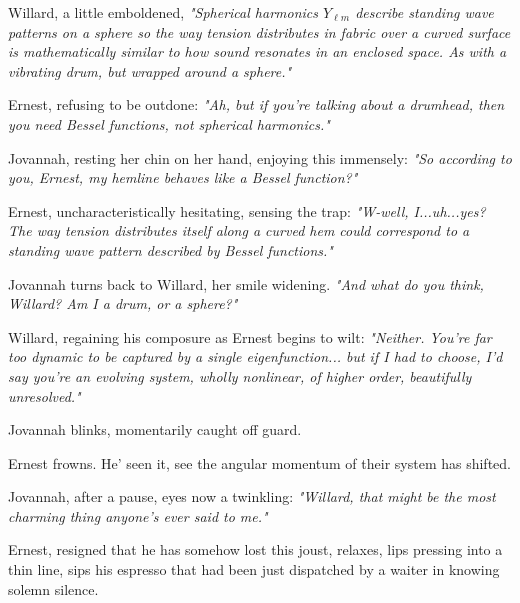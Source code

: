 \bigskip

Willard, a little emboldened,  \textit{"Spherical harmonics $Y_{\ell m}$ describe standing wave patterns on a sphere so the way tension distributes in fabric over a curved surface is mathematically similar to how sound resonates in an enclosed space. As with a vibrating drum, but wrapped around a sphere."}  

\bigskip

Ernest, refusing to be outdone: \textit{"Ah, but if you’re talking about a drumhead, then you need Bessel functions, not spherical harmonics."}  

\bigskip

Jovannah, resting her chin on her hand, enjoying this immensely:  
\textit{"So according to you, Ernest, my hemline behaves like a Bessel function?"}

\bigskip

Ernest, uncharacteristically hesitating, sensing the trap:  \textit{"W-well, I...uh...yes? The way tension distributes itself along a curved hem could correspond to a standing wave pattern described by Bessel functions."}  

\bigskip

Jovannah turns back to Willard, her smile widening.  \textit{"And what do you think, Willard? Am I a drum, or a sphere?"}

\bigskip

Willard, regaining his composure as Ernest begins to wilt:  \textit{"Neither. You’re far too dynamic to be captured by a single eigenfunction... but if I had to choose, I’d say you’re an evolving system, wholly nonlinear, of higher order, beautifully unresolved."}  

\bigskip

Jovannah blinks, momentarily caught off guard.  

\bigskip

Ernest frowns. He' seen it, see the angular momentum of their system has  shifted.  

\bigskip

Jovannah, after a pause, eyes now a twinkling: \textit{"Willard, that might be the most charming thing anyone’s ever said to me."}  

\bigskip

Ernest, resigned that he has somehow lost this joust, relaxes, lips pressing into a thin line, sips his espresso that had been just dispatched by a waiter in knowing solemn silence.

\bigskip

